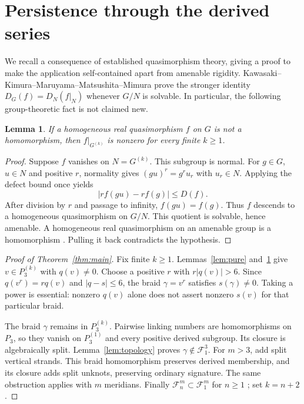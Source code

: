 \documentclass[11pt]{article}
\newtheorem{lemma}[theorem]{Lemma}
\newcommand{\F}{\mathcal F}
\begin{document}
\section{Persistence through the derived series}
We recall a consequence of established quasimorphism theory, giving a
proof to make the application self-contained apart from amenable rigidity.
Kawasaki--Kimura--Maruyama--Matsushita--Mimura
\cite[Lemma 7.12, p.1207]{KKMMM} prove the stronger identity
$D_G(f)=D_N(f|_N)$ whenever $G/N$ is solvable.
In particular, the following group-theoretic fact is not claimed new.

\begin{lemma}\label{lem:derived}
If a homogeneous real quasimorphism $f$ on $G$ is not a homomorphism,
then $f|_{G^{(k)}}$ is nonzero for every finite $k\geq1$.
\end{lemma}
\begin{proof}
Suppose $f$ vanishes on $N=G^{(k)}$. This subgroup is normal.
For $g\in G$, $u\in N$ and positive $r$, normality gives
$(gu)^r=g^r u_r$ with $u_r\in N$. Applying the defect bound once yields
\[
 |r f(gu)-r f(g)|\leq D(f).
\]
After division by $r$ and passage to infinity, $f(gu)=f(g)$.
Thus $f$ descends to a homogeneous quasimorphism on $G/N$.
This quotient is solvable, hence amenable. A homogeneous real
quasimorphism on an amenable group is a homomorphism
\cite[Proposition 2.65, p.33; p.27]{Calegari}.
Pulling it back contradicts the hypothesis.
\end{proof}

\begin{proof}[Proof of Theorem~\ref{thm:main}]
Fix finite $k\geq1$. Lemmas~\ref{lem:pure} and~\ref{lem:derived}
give $v\in P_3^{(k)}$ with $q(v)\ne0$.
Choose a positive $r$ with $r|q(v)|>6$. Since
$q(v^r)=rq(v)$ and $|q-s|\leq6$, the braid $\gamma=v^r$ satisfies
$s(\gamma)\ne0$. Taking a power is essential: nonzero $q(v)$ alone
does not assert nonzero $s(v)$ for that particular braid.

The braid $\gamma$ remains in $P_3^{(k)}$. Pairwise linking numbers
are homomorphisms on $P_3$, so they vanish on $P_3^{(1)}$ and every
positive derived subgroup. Its closure is algebraically split.
Lemma~\ref{lem:topology} proves $\gamma\notin\F_1^3$.
For $m>3$, add split vertical strands. This braid homomorphism preserves
derived membership, and its closure adds split unknots, preserving
ordinary signature. The same obstruction applies with $m$ meridians.
Finally $\F_n^m\subset\F_1^m$ for $n\geq1$
\cite[Section 2]{Otto}; set $k=n+2$.
\end{proof}
\end{document}
